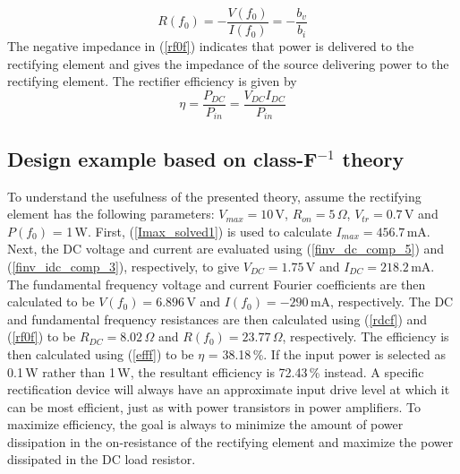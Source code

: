 \begin{equation}\label{rf0f}
    R(f_0) = -\frac{V(f_0)}{I(f_0)} = -\frac{b_v}{b_i}
\end{equation}
The negative impedance in (\ref{rf0f}) indicates that power is delivered to the rectifying element and gives the impedance of the source delivering power to the rectifying element.  The rectifier efficiency is given by
\begin{equation}\label{efff}
    \eta = \frac{P_{DC}}{P_{in}} = \frac{V_{DC}I_{DC}}{P_{in}}
\end{equation}










\subsection {Design example based on class-F$^{-1}$ theory}

To understand the usefulness of the presented theory, assume the rectifying element has the following parameters: $V_{max} = 10$\,V, $R_{on} = 5$\,$\Omega$, $V_{tr} = 0.7$\,V and $P(f_0)$ = 1\,W.  First, (\ref{Imax_solved1}) is used to calculate $I_{max}=456.7$\,mA. Next, the DC voltage and current are evaluated using (\ref{finv_dc_comp_5}) and (\ref{finv_idc_comp_3}), respectively, to give $V_{DC}=1.75$\,V and $I_{DC}=218.2$\,mA. The fundamental frequency voltage and current Fourier coefficients are then calculated to be $V(f_0)=6.896$\,V and $I(f_0)=-290$\,mA, respectively.  The DC and fundamental frequency resistances are then calculated using (\ref{rdcf}) and (\ref{rf0f}) to be $R_{DC}=8.02$\,$\Omega$ and $R(f_0)=23.77$\,$\Omega$, respectively.  The efficiency is then calculated using (\ref{efff}) to be $\eta$ = 38.18\,\%. If the input power is selected as 0.1\,W rather than 1\,W, the resultant efficiency is 72.43\,\% instead.  A specific rectification device will always have an approximate input drive level at which it can be most efficient, just as with power transistors in power amplifiers. To maximize efficiency, the goal is always to minimize the amount of power dissipation in the on-resistance of the rectifying element and maximize the power dissipated in the DC load resistor.










